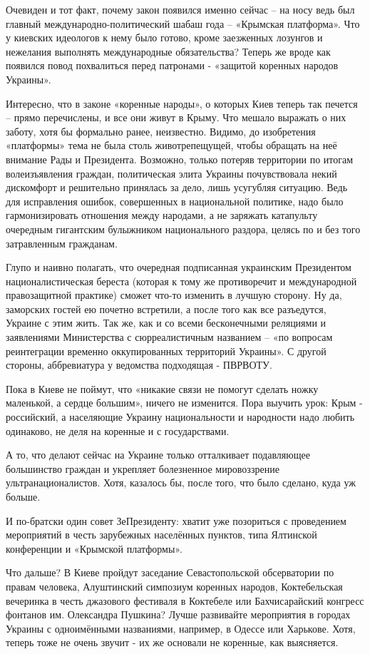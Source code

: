 Очевиден и тот факт, почему закон появился именно сейчас – на носу ведь был
главный международно-политический шабаш года – «Крымская платформа». Что у
киевских идеологов к нему было готово, кроме заезженных лозунгов и нежелания
выполнять международные обязательства? Теперь же вроде как появился повод
похвалиться перед патронами - «защитой коренных народов Украины». 

Интересно, что в законе «коренные народы», о которых Киев теперь так печется –
прямо перечислены, и все они живут в Крыму. Что мешало выражать о них заботу,
хотя бы формально ранее, неизвестно. Видимо, до изобретения «платформы» тема не
была столь животрепещущей, чтобы обращать на неё внимание Рады и Президента.
Возможно, только потеряв территории по итогам волеизъявления граждан,
политическая элита Украины почувствовала некий дискомфорт и решительно
принялась за дело, лишь усугубляя ситуацию. Ведь для исправления ошибок,
совершенных в национальной политике, надо было гармонизировать отношения между
народами, а не заряжать катапульту очередным гигантским булыжником
национального раздора, целясь по и без того затравленным гражданам. 

Глупо и наивно полагать, что очередная подписанная украинским Президентом
националистическая береста (которая к тому же противоречит и международной
правозащитной практике) сможет что-то изменить в лучшую сторону. Ну да,
заморских гостей ею почетно встретили, а после того как все разъедутся, Украине
с этим жить. Так же, как и со всеми бесконечными реляциями и заявлениями
Министерства с сюрреалистичным названием – «по вопросам реинтеграции временно
оккупированных территорий Украины». С другой стороны, аббревиатура у ведомства
подходящая - ПВРВОТУ. 

Пока в Киеве не поймут, что «никакие связи не помогут сделать ножку маленькой,
а сердце большим», ничего не изменится. Пора выучить урок: Крым - российский, а
населяющие Украину национальности и народности надо любить одинаково, не деля
на коренные и с государствами.  

А то, что делают сейчас на Украине только отталкивает подавляющее большинство
граждан и укрепляет болезненное мировоззрение ультранационалистов. Хотя,
казалось бы, после того, что было сделано, куда уж больше.

И по-братски один совет ЗеПрезиденту: хватит уже позориться с проведением
мероприятий в честь зарубежных населённых пунктов, типа Ялтинской конференции и
«Крымской платформы».

Что дальше? В Киеве пройдут заседание Севастопольской обсерватории по правам
человека, Алуштинский симпозиум коренных народов, Коктебельская вечеринка в
честь джазового фестиваля в Коктебеле или Бахчисарайский конгресс фонтанов им.
Олександра Пушкина? Лучше развивайте мероприятия в городах Украины с
одноимёнными названиями, например, в Одессе или Харькове. Хотя, теперь тоже не
очень звучит - их же основали не коренные, как выясняется.
